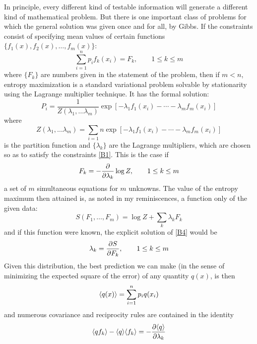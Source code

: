 In principle, every different kind of testable information will generate a different kind of mathematical problem.
But there is one important class of problems for which the general solution was given once and for all, by Gibbs.
If the constraints consist of specifying mean values of certain functions $\{f_1(x) ,f_2(x),\ldots, f_m(x)\}$:
\begin{equation}
	\label{B1}
	\sum_{i=1}^{n} p_i f_k(x_i) = F_k, \qquad 1 \leq k \leq m
\end{equation}
where $\{F_k\}$ are numbers given in the statement of the problem, then if $m < n$, entropy maximization is a standard variational problem solvable by stationarity using the Lagrange multiplier technique.
It has the formal solution:
\begin{equation}
	\label{B2}
	P_i = \frac{1}{Z(\lambda_1, \ldots \lambda_m)} \exp\left[-\lambda_1f_1(x_i) - \cdots - \lambda_mf_m(x_i)\right]
\end{equation}
where
\begin{equation}
	\label{B3}
	Z(\lambda_1, \ldots \lambda_m) = \sum_{i=1}{n} \exp\left[-\lambda_1f_1(x_i) - \cdots - \lambda_mf_m(x_i)\right]
\end{equation}
is the partition function and $\{\lambda_k\}$ are the Lagrange multipliers, which are chosen so as to satisfy the constraints \eqref{B1}.
This is the case if
\begin{equation}
	\label{B4}
	F_k = -\pdv{}{\lambda_k} \log Z, \qquad 1\leq k\leq m
\end{equation}
a set of $m$ simultaneous equations for $m$ unknowns.
The value of the entropy maximum then attained is, as noted in my reminiscences, a function only of the given data:
\begin{equation}
	\label{B5}
	S(F_1, \ldots, F_m) = \log Z + \sum_{k} \lambda_k F_k
\end{equation}
and if this function were known, the explicit solution of \eqref{B4} would be
\begin{equation}
	\label{B6}
	\lambda_k = \pdv{S}{F_k}, \qquad 1\leq k\leq m
\end{equation}
Given this distribution, the best prediction we can make (in the sense of minimizing the expected square of the error) of any quantity $q(x)$, is then
\begin{equation*}
	\langle q(x)\rangle = \sum_{i=1}^{n} p_i q(x_i)
\end{equation*}
and numerous covariance and reciprocity rules are contained in the identity
\begin{equation}
	\label{B7}
	\langle qf_k\rangle - \langle q\rangle \langle f_k\rangle = - \pdv{\langle q\rangle}{\lambda_k}
\end{equation}
